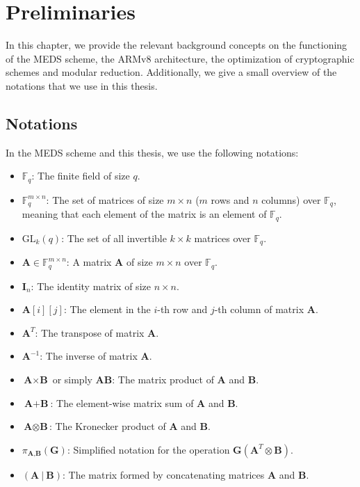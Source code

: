 \documentclass[11pt,a4paper]{report}
\theoremstyle{definition}
\begin{document}
\chapter{Preliminaries}
\label{ch:preliminaries}
In this chapter, we provide the relevant background concepts on the functioning of the MEDS scheme, the ARMv8 architecture, the optimization of cryptographic schemes and modular reduction. Additionally, we give a small overview of the notations that we use in this thesis.

\section{Notations}
\label{sec:notations}
In the MEDS scheme and this thesis, we use the following notations:
\begin{itemize}
  \item $\mathbb{F}_q$: The finite field of size $q$.
  \item $\mathbb{F}_q^{m \times n}$: The set of matrices of size $m \times n$ ($m$ rows and $n$ columns) over $\mathbb{F}_q$, meaning that each element of the matrix is an element of $\mathbb{F}_q$.
  \item $\text{GL}_k(q)$: The set of all invertible $k \times k$ matrices over $\mathds{F}_q$.
  \item $\textbf{A} \in \mathbb{F}_q^{m \times n}$: A matrix $\textbf{A}$ of size $m \times n$ over $\mathbb{F}_q$.
  \item $\textbf{I}_n$: The identity matrix of size $n \times n$.
  \item $\textbf{A}[i][j]$: The element in the $i$-th row and $j$-th column of matrix $\textbf{A}$.
  \item $\textbf{A}^T$: The transpose of matrix $\textbf{A}$.
  \item $\textbf{A}^{-1}$: The inverse of matrix $\textbf{A}$.
  \item $\textbf{A} \times \textbf{B}$ or simply $\textbf{AB}$: The matrix product of $\textbf{A}$ and $\textbf{B}$.
  \item $\textbf{A} + \textbf{B}$: The element-wise matrix sum of $\textbf{A}$ and $\textbf{B}$.
  \item $\textbf{A} \otimes \textbf{B}$: The Kronecker product of $\textbf{A}$ and $\textbf{B}$.
  \item $\pi_{\textbf{A}, \textbf{B}}(\textbf{G})$: Simplified notation for the operation $\textbf{G}(\textbf{A}^T \otimes \textbf{B})$.
  \item $(\textbf{A}~|~\textbf{B})$: The matrix formed by concatenating matrices $\textbf{A}$ and $\textbf{B}$.
\end{itemize}
\end{document}
